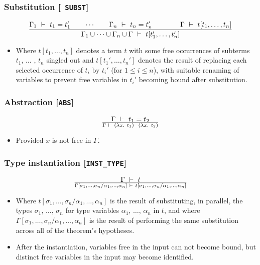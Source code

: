 \subsubsection*{Substitution [{\small\tt
SUBST}]} 
\[
{\Gamma_1\ \vdash\  t_1 = t_1'\qquad\cdots\qquad\Gamma_n\ \vdash\  t_n =
t_n'\qquad\qquad \Gamma\ \vdash\  t[t_1,\ldots,t_n]
\over
\Gamma_1\cup\cdots\cup\Gamma_n\cup\Gamma\ \vdash\  t[t_1',\ldots,t_n']}
\]
\begin{itemize}
\item Where $t[t_1,\ldots,t_n]$ denotes a term $t$ with some free
occurrences of subterms $t_1$, $\ldots$ , $t_n$ singled out and
$t[t_1',\ldots,t_n']$ denotes the result of replacing each selected
occurrence of $t_i$ by $t_i'$ (for $1{\leq}i{\leq}n$), with suitable
renaming of variables to prevent free variables in $t_i'$ becoming
bound after substitution.
\end{itemize}

\subsubsection*{Abstraction [{\small\tt ABS}]}
\[
\Gamma\ \vdash\  t_1 = t_2
\over
\Gamma\ \vdash\  (\lambda x.\ t_1) = (\lambda x.\ t_2)
\]
\begin{itemize}
\item Provided $x$ is not free in $\Gamma$.
\end{itemize}

\subsubsection*{Type instantiation [{\small\tt INST\_TYPE}]}
\newcommand{\insttysub}{[\sigma_1,\ldots,\sigma_n/\alpha_1,\ldots,\alpha_n]}
\[
\Gamma\turn t
\over
\Gamma\insttysub\turn t\insttysub
\]
\begin{itemize}
\item Where $t\insttysub$ is the result of substituting, in parallel,
  the types $\sigma_1$, $\dots$, $\sigma_n$ for type variables
  $\alpha_1$, $\dots$, $\alpha_n$ in $t$, and where $\Gamma\insttysub$
  is the result of performing the same substitution across all of the
  theorem's hypotheses.
\item After the instantiation, variables free in the input can not
  become bound, but distinct free variables in the input may become
  identified.
\end{itemize}

